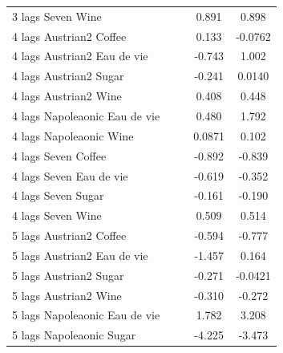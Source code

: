 \documentclass[12pt,a4paper,titlepage]{article}
\begin{document}
{\begin{longtable}{l*{4}{c}}
3 lags Seven Wine   &                     &                     &       0.891\sym{***}&       0.898\sym{***}\\
4 lags Austrian2 Coffee&                     &                     &       0.133         &     -0.0762         \\
4 lags Austrian2 Eau de vie&                     &                     &      -0.743\sym{*}  &       1.002         \\
4 lags Austrian2 Sugar&                     &                     &      -0.241         &      0.0140         \\
4 lags Austrian2 Wine&                     &                     &       0.408         &       0.448         \\
4 lags Napoleaonic Eau de vie&                     &                     &       0.480         &       1.792         \\
4 lags Napoleaonic Wine&                     &                     &      0.0871         &       0.102         \\
4 lags Seven Coffee &                     &                     &      -0.892\sym{***}&      -0.839\sym{***}\\
4 lags Seven Eau de vie&                     &                     &      -0.619\sym{***}&      -0.352         \\
4 lags Seven Sugar  &                     &                     &      -0.161\sym{*}  &      -0.190\sym{*}  \\
4 lags Seven Wine   &                     &                     &       0.509\sym{***}&       0.514\sym{***}\\
5 lags Austrian2 Coffee&                     &                     &      -0.594\sym{***}&      -0.777\sym{***}\\
5 lags Austrian2 Eau de vie&                     &                     &      -1.457\sym{***}&       0.164         \\
5 lags Austrian2 Sugar&                     &                     &      -0.271\sym{*}  &     -0.0421         \\
5 lags Austrian2 Wine&                     &                     &      -0.310         &      -0.272         \\
5 lags Napoleaonic Eau de vie&                     &                     &       1.782         &       3.208         \\
5 lags Napoleaonic Sugar&                     &                     &      -4.225\sym{***}&      -3.473\sym{***}\\

\end{longtable}}
\end{document}
